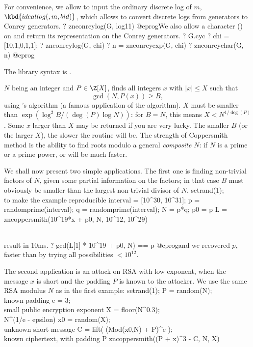 For convenience, we allow to input the ordinary discrete log of $m$,
$\kbd{ideallog(,m,bid)}$, which allows to convert discrete logs
from  generators to Conrey generators.
\bprog
? znconreylog(G, log11)
@eprog\noindent We also allow a character () on  and
return its representation on the Conrey generators.
\bprog
? G.cyc
? chi = [10,1,0,1,1];
? znconreylog(G, chi)
? n = znconreyexp(G, chi)
? znconreychar(G, n)
@eprog

The library syntax is .

\label{se:zncoppersmith}
$N$ being an integer and $P\in \Z[X]$, finds all integers $x$ with
$|x| \leq X$ such that
$$\gcd(N, P(x)) \geq B,$$
using 's algorithm (a famous application of the 
algorithm). $X$ must be smaller than $\exp(\log^2 B / (\deg(P) \log N))$:
for $B = N$, this means $X < N^{1/\deg(P)}$. Some $x$ larger than $X$ may
be returned if you are very lucky. The smaller $B$ (or the larger $X$), the
slower the routine will be. The strength of Coppersmith method is the
ability to find roots modulo a general \emph{composite} $N$: if $N$ is a prime
or a prime power,  or  will be much
faster.

We shall now present two simple applications. The first one is
finding non-trivial factors of $N$, given some partial information on the
factors; in that case $B$ must obviously be smaller than the largest
non-trivial divisor of $N$.
\bprog
setrand(1); \\ to make the example reproducible
interval = [10^30, 10^31];
p = randomprime(interval);
q = randomprime(interval); N = p*q;
p0 = p %
L = zncoppersmith(10^19*x + p0, N, 10^12, 10^29)

\\ result in 10ms.
? gcd(L[1] * 10^19 + p0, N) == p
@eprog\noindent and we recovered $p$, faster than by trying all
possibilities $ < 10^{12}$.

The second application is an attack on RSA with low exponent, when the
message $x$ is short and the padding $P$ is known to the attacker. We use
the same RSA modulus $N$ as in the first example:
\bprog
setrand(1);
P = random(N);    \\ known padding
e = 3;            \\ small public encryption exponent
X = floor(N^0.3); \\ N^(1/e - epsilon)
x0 = random(X);   \\ unknown short message
C = lift( (Mod(x0,N) + P)^e ); \\ known ciphertext, with padding P
zncoppersmith((P + x)^3 - C, N, X)

